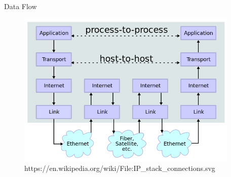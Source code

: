 \begin{frame}{Data Flow}
	\begin{figure}
		\includegraphics[width=300pt]{../common/images/IP_stack_connections_flow.png}\\
		{\small https://en.wikipedia.org/wiki/File:IP\_stack\_connections.svg}
	\end{figure}
\end{frame}
